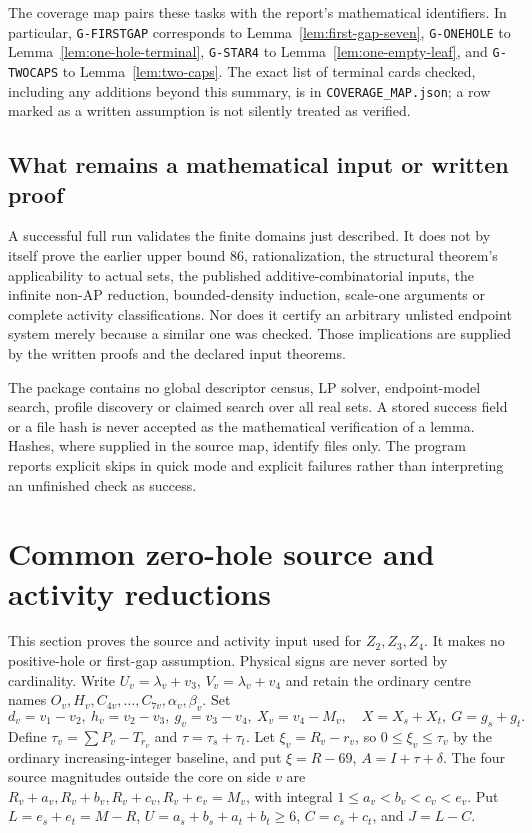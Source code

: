 \documentclass[11pt,letterpaper]{article}
\theoremstyle{definition}\newtheorem{definition}[theorem]{Definition}
\begin{document}
The coverage map pairs these tasks with the report's mathematical identifiers. In particular, \texttt{G-FIRSTGAP} corresponds to Lemma~\ref{lem:first-gap-seven}, \texttt{G-ONEHOLE} to Lemma~\ref{lem:one-hole-terminal}, \texttt{G-STAR4} to Lemma~\ref{lem:one-empty-leaf}, and \texttt{G-TWOCAPS} to Lemma~\ref{lem:two-caps}. The exact list of terminal cards checked, including any additions beyond this summary, is in \texttt{COVERAGE\_MAP.json}; a row marked as a written assumption is not silently treated as verified.

\subsection{What remains a mathematical input or written proof}
A successful full run validates the finite domains just described. It does not by itself prove the earlier upper bound $86$, rationalization, the structural theorem's applicability to actual sets, the published additive-combinatorial inputs, the infinite non-AP reduction, bounded-density induction, scale-one arguments or complete activity classifications. Nor does it certify an arbitrary unlisted endpoint system merely because a similar one was checked. Those implications are supplied by the written proofs and the declared input theorems.

The package contains no global descriptor census, LP solver, endpoint-model search, profile discovery or claimed search over all real sets. A stored success field or a file hash is never accepted as the mathematical verification of a lemma. Hashes, where supplied in the source map, identify files only. The program reports explicit skips in quick mode and explicit failures rather than interpreting an unfinished check as success.



\clearpage
\appendix


\section{Common zero-hole source and activity reductions}\label{sec:z-activity}
This section proves the source and activity input used for $Z_2,Z_3,Z_4$.
It makes no positive-hole or first-gap assumption. Physical signs are never sorted by cardinality.
Write $U_v=\lambda_v+v_3$, $V_v=\lambda_v+v_4$ and retain the ordinary centre names $O_v,H_v,C_{4v},\ldots,C_{7v},\alpha_v,\beta_v$. Set
\[
 d_v=v_1-v_2,\ h_v=v_2-v_3,\ g_v=v_3-v_4,\ X_v=v_4-M_v,
 \quad X=X_s+X_t,\ G=g_s+g_t.
\]
Define $\tau_v=\sum P_v-T_{r_v}$ and $\tau=\tau_s+\tau_t$. Let $\xi_v=R_v-r_v$, so $0\le\xi_v\le\tau_v$ by the ordinary increasing-integer baseline, and put $\xi=R-69$, $A=I+\tau+\delta$.
The four source magnitudes outside the core on side $v$ are
$R_v+a_v,R_v+b_v,R_v+c_v,R_v+e_v=M_v$, with integral $1\le a_v<b_v<c_v<e_v$.
Put $L=e_s+e_t=M-R$, $U=a_s+b_s+a_t+b_t\ge6$, $C=c_s+c_t$, and $J=L-C$.
\end{document}
